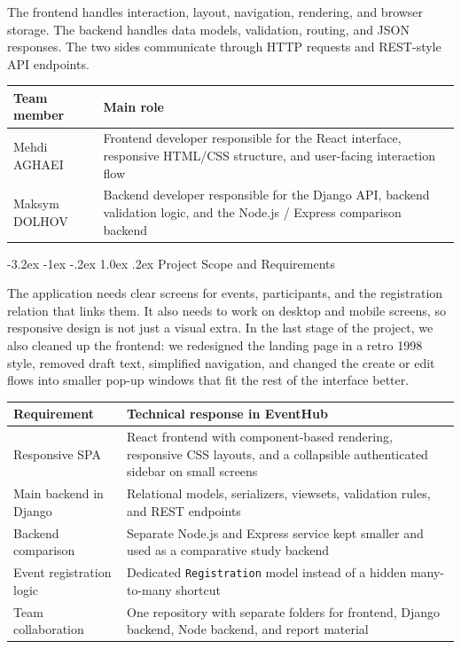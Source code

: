 \documentclass[11pt,a4paper]{article}
\makeatletter
\renewcommand\section{\@startsection{section}{1}{\z@}%
  {-3.2ex \@plus -1ex \@minus -.2ex}%
  {1.0ex \@plus .2ex}%
  {\normalfont\Large\sffamily\bfseries\color{ink}}}
\makeatother
\begin{document}
The frontend handles interaction, layout, navigation, rendering, and browser storage. The backend handles data models, validation, routing, and JSON responses. The two sides communicate through HTTP requests and REST-style API endpoints.

\begin{center}
\begin{tabularx}{\textwidth}{@{}lY@{}}
\toprule
\textbf{Team member} & \textbf{Main role} \\
\midrule
Mehdi AGHAEI & Frontend developer responsible for the React interface, responsive HTML/CSS structure, and user-facing interaction flow \\
Maksym DOLHOV & Backend developer responsible for the Django API, backend validation logic, and the Node.js / Express comparison backend \\
\bottomrule
\end{tabularx}
\end{center}

\section{Project Scope and Requirements}

The application needs clear screens for events, participants, and the registration relation that links them. It also needs to work on desktop and mobile screens, so responsive design is not just a visual extra. In the last stage of the project, we also cleaned up the frontend: we redesigned the landing page in a retro 1998 style, removed draft text, simplified navigation, and changed the create or edit flows into smaller pop-up windows that fit the rest of the interface better.

\begin{center}
\begin{tabularx}{\textwidth}{@{}lY@{}}
\toprule
\textbf{Requirement} & \textbf{Technical response in EventHub} \\
\midrule
Responsive SPA & React frontend with component-based rendering, responsive CSS layouts, and a collapsible authenticated sidebar on small screens \\
Main backend in Django & Relational models, serializers, viewsets, validation rules, and REST endpoints \\
Backend comparison & Separate Node.js and Express service kept smaller and used as a comparative study backend \\
Event registration logic & Dedicated \texttt{Registration} model instead of a hidden many-to-many shortcut \\
Team collaboration & One repository with separate folders for frontend, Django backend, Node backend, and report material \\
\bottomrule
\end{tabularx}
\end{center}
\end{document}
